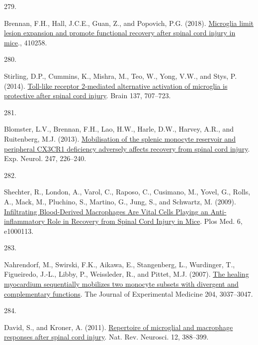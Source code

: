 \documentclass[
]{article}
\newlength{\cslhangindent}
\newlength{\csllabelwidth}
\newlength{\cslentryspacingunit} %
\newenvironment{CSLReferences}[2] %
 {%
  \setlength{\parindent}{0pt}
  \ifodd #1
  \let\oldpar\par
  \def\par{\hangindent=\cslhangindent\oldpar}
  \fi
  \setlength{\parskip}{#2\cslentryspacingunit}
 }%
 {}
\newcommand{\CSLLeftMargin}[1]{\parbox[t]{\csllabelwidth}{#1}}
\newcommand{\CSLRightInline}[1]{\parbox[t]{\linewidth - \csllabelwidth}{#1}\break}
\begin{document}
\begin{CSLReferences}{0}{0}
\leavevmode{}%
\CSLLeftMargin{279. }
\CSLRightInline{Brennan, F.H., Hall, J.C.E., Guan, Z., and Popovich, P.G. (2018). \href{https://doi.org/10.1101/410258}{Microglia limit lesion expansion and promote functional recovery after spinal cord injury in mice}., 410258.}

\leavevmode{}%
\CSLLeftMargin{280. }
\CSLRightInline{Stirling, D.P., Cummins, K., Mishra, M., Teo, W., Yong, V.W., and Stys, P. (2014). \href{https://doi.org/10.1093/brain/awt341}{Toll-like receptor 2-mediated alternative activation of microglia is protective after spinal cord injury}. Brain 137, 707--723.}

\leavevmode{}%
\CSLLeftMargin{281. }
\CSLRightInline{Blomster, L.V., Brennan, F.H., Lao, H.W., Harle, D.W., Harvey, A.R., and Ruitenberg, M.J. (2013). \href{https://doi.org/10.1016/j.expneurol.2013.05.002}{Mobilisation of the splenic monocyte reservoir and peripheral {CX3CR1} deficiency adversely affects recovery from spinal cord injury}. Exp. Neurol. 247, 226--240.}

\leavevmode{}%
\CSLLeftMargin{282. }
\CSLRightInline{Shechter, R., London, A., Varol, C., Raposo, C., Cusimano, M., Yovel, G., Rolls, A., Mack, M., Pluchino, S., Martino, G., Jung, S., and Schwartz, M. (2009). \href{https://doi.org/10.1371/journal.pmed.1000113}{Infiltrating {Blood-Derived Macrophages Are Vital Cells Playing} an {Anti-inflammatory Role} in {Recovery} from {Spinal Cord Injury} in {Mice}}. Plos Med. 6, e1000113.}

\leavevmode{}%
\CSLLeftMargin{283. }
\CSLRightInline{Nahrendorf, M., Swirski, F.K., Aikawa, E., Stangenberg, L., Wurdinger, T., Figueiredo, J.-L., Libby, P., Weissleder, R., and Pittet, M.J. (2007). \href{https://doi.org/10.1084/jem.20070885}{The healing myocardium sequentially mobilizes two monocyte subsets with divergent and complementary functions}. The Journal of Experimental Medicine 204, 3037--3047.}

\leavevmode{}%
\CSLLeftMargin{284. }
\CSLRightInline{David, S., and Kroner, A. (2011). \href{https://doi.org/10.1038/nrn3053}{Repertoire of microglial and macrophage responses after spinal cord injury}. Nat. Rev. Neurosci. 12, 388--399.}


\end{CSLReferences}
\end{document}
